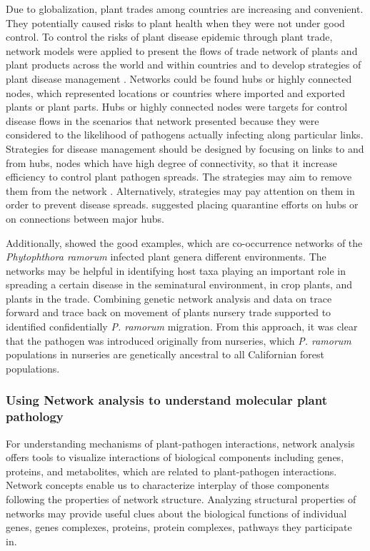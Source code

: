 Due to globalization, plant trades among countries are increasing and convenient. They potentially caused risks to plant health when they were not under good control. To control the risks of plant disease epidemic through plant trade, network models were applied to present the flows of trade network of plants and plant products across the world and within countries and to develop strategies of plant disease management \citep{pautasso2015network}. Networks could be found hubs or highly connected nodes, which represented locations or countries where imported and exported plants or plant parts. Hubs or highly connected nodes were targets for control disease flows in the scenarios that network presented because they were considered to the likelihood of pathogens actually infecting along particular links. Strategies for disease management should be designed by focusing on links to and from hubs, nodes which have high degree of connectivity, so that it increase efficiency to control plant pathogen spreads. The strategies may aim to remove them from the network \citep{Jeger:2007tn, Lefebvre:2011fo}. Alternatively, strategies may pay attention on them in order to prevent disease spreads. \citet{Shaw:2014cka} suggested placing quarantine efforts on hubs or on connections between major hubs.

Additionally, \citet{pautasso2008epidemiological} showed the good examples, which are co-occurrence networks of the \textit{Phytophthora ramorum} infected plant genera different environments. The networks may be helpful in identifying host taxa playing an important role in spreading a certain disease in the seminatural environment, in crop plants, and plants in the trade. Combining genetic network analysis and data on trace forward and trace back on movement of plants nursery trade supported to identified confidentially \textit{P. ramorum} migration. From this approach, it was clear that the pathogen was introduced originally from nurseries, which \textit{P. ramorum} populations in nurseries are genetically ancestral to all Californian forest populations.

\subsubsection*{Using Network analysis to understand molecular plant pathology}

For understanding mechanisms of plant-pathogen interactions, network analysis offers tools to visualize interactions of biological components including genes, proteins, and metabolites, which are related to plant-pathogen interactions. Network concepts enable us to characterize interplay of those components following the properties of network structure. Analyzing structural properties of networks may provide useful clues about the biological functions of individual genes, genes complexes, proteins, protein complexes, pathways they participate in.

